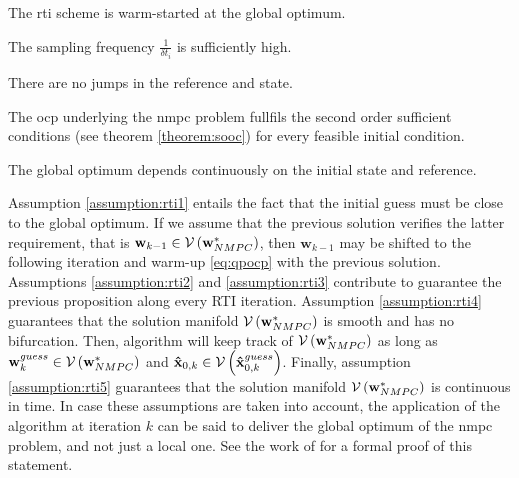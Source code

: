 \begin{assumption}\label{assumption:rti1}
The \acrshort{rti} scheme is warm-started at the global optimum.
\end{assumption}

\begin{assumption}\label{assumption:rti2}
The sampling frequency $\frac{1}{\delta t_i}$ is sufficiently high.
\end{assumption}

\begin{assumption}\label{assumption:rti3}
There are no jumps in the reference and state.
\end{assumption}

\begin{assumption}\label{assumption:rti4}
The \acrshort{ocp} underlying the \acrshort{nmpc} problem fullfils the second order sufficient conditions (see theorem \ref{theorem:sooc}) for every feasible initial condition.
\end{assumption}

\begin{assumption}\label{assumption:rti5}
The global optimum depends continuously on the initial state and reference.
\end{assumption}

Assumption \ref{assumption:rti1} entails the fact that the initial guess must be close to the global optimum. If we assume that the previous solution verifies the latter requirement, that is $\mathbf{w}_{k-1} \in \mathcal{V}\left( \mathbf{w}_{NMPC}^* \right)$, then $\mathbf{w}_{k-1}$ may be shifted to the following iteration and warm-up \ref{eq:qpocp} with the previous solution. Assumptions \ref{assumption:rti2} and \ref{assumption:rti3} contribute to guarantee the previous proposition along every RTI iteration. Assumption \ref{assumption:rti4} guarantees that the solution manifold $\mathcal{V}\left(\mathbf{w}_{NMPC}^*\right)$ is smooth and has no bifurcation. Then, algorithm  \cite{gros2020linear} will keep track of $\mathcal{V}\left( \mathbf{w}_{NMPC}^* \right)$ as long as $\mathbf{w}_{k}^{guess} \in \mathcal{V}\left( \mathbf{w}_{NMPC}^* \right)$ and $\mathbf{\hat{x}}_{0, k} \in \mathcal{V}\left( \mathbf{\hat{x}}_{0, k}^{guess}\right)$. Finally, assumption \ref{assumption:rti5} guarantees that the solution manifold $\mathcal{V}\left( \mathbf{w}_{NMPC}^* \right)$ is continuous in time. In case these assumptions are taken into account, the application of the  algorithm at iteration $k$ can be said to deliver the global optimum of the \acrshort{nmpc} problem, and not just a local one. See the work of \citet{diehl2001real} for a formal proof of this statement.

